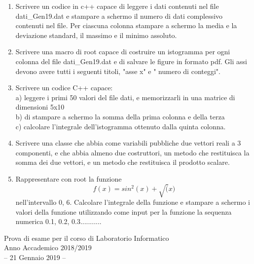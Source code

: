 \documentclass[11pt,fleqn]{book} %
\begin{document}
\begin{enumerate}
\item Scrivere un codice in c++ capace di  leggere i dati contenuti nel file  dati\_Gen19.dat e stampare a schermo il numero di dati complessivo contenuti nel file. Per ciascuna colonna stampare a schermo la media e la deviazione standard, il massimo e il minimo assoluto.

\item Scrivere una macro di root capace di costruire un istogramma per ogni colonna del file dati\_Gen19.dat e di salvare le figure in formato pdf. Gli assi devono avere tutti i seguenti titoli,
"asse x" e " numero di conteggi". 
 

\item Scrivere un codice C++ capace:\\
     a) leggere i primi 50 valori del file dati, e memorizzarli in una matrice di dimensioni 5x10 \\
     b) di stampare a schermo la somma della prima colonna e della terza\\
     c) calcolare l'integrale dell'istogramma ottenuto dalla quinta colonna.

\item Scrivere una classe che abbia come variabili pubbliche due vettori reali a 3 componenti, e che abbia almeno due costruttori, un metodo che restituisca la somma dei due vettori, e un metodo che restituisca il prodotto scalare.

\item Rappresentare con root la funzione 
$$f(x)=sin^2(x)+\sqrt(x)$$
nell'intervallo 0, 6. Calcolare l'integrale della funzione e stampare a schermo i valori della funzione utilizzando come input per la funzione la sequenza numerica 0.1, 0.2, 0.3...........

\end{enumerate}

{
\Large\centering
Prova di esame per il corso di Laboratorio Informatico\\		
Anno Accademico 2018/2019\\
-- 21 Gennaio 2019 --\\
}
\end{document}
